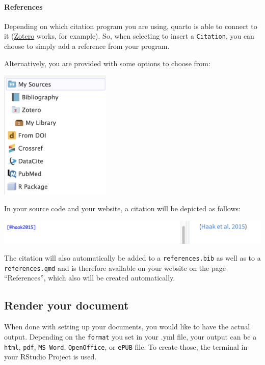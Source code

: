 \documentclass[
  letterpaper,
  DIV=11,
  numbers=noendperiod]{scrreprt}
\let\oldparagraph\paragraph
\renewcommand{\paragraph}[1]{\oldparagraph{#1}\mbox{}}
\begin{document}
\hypertarget{references}{%
\paragraph{References}\label{references}}

Depending on which citation program you are using, quarto is able to
connect to it (\href{https://www.zotero.org}{Zotero} works, for
example). So, when selecting to insert a \texttt{Citation}, you can
choose to simply add a reference from your program.

Alternatively, you are provided with some options to choose from:

\includegraphics[width=2.08333in,height=\textheight]{img/quarto_intro/Screenshot 2023-10-11 at 15.09.41.png}

In your source code and your website, a citation will be depicted as
follows:

\includegraphics{img/quarto_intro/Screenshot 2023-10-11 at 15.12.57.png}

The citation will also automatically be added to a
\texttt{references.bib} as well as to a \texttt{references.qmd} and is
therefore available on your website on the page ``References'', which
also will be created automatically.

\hypertarget{render-your-document}{%
\subsection{Render your document}\label{render-your-document}}

When done with setting up your documents, you would like to have the
actual output. Depending on the \texttt{format} you set in your .yml
file, your output can be a \texttt{html}, \texttt{pdf},
\texttt{MS\ Word}, \texttt{OpenOffice}, or \texttt{ePUB} file. To create
those, the terminal in your RStudio Project is used.
\end{document}
